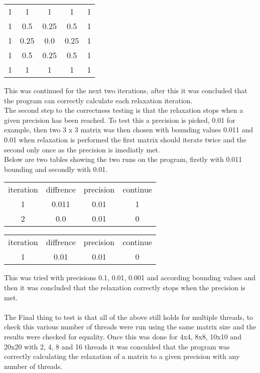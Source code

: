 \documentclass{article}
\begin{document}
\begin{center}
\begin{tabular}{ c c c c c }
 1 & 1 & 1 & 1 & 1 \\
 1 & 0.5 & 0.25 & 0.5 & 1 \\
 1 & 0.25 & 0.0 & 0.25 & 1 \\
 1 & 0.5 & 0.25 & 0.5 & 1 \\
 1 & 1 & 1 & 1 & 1 \\
\end{tabular}
\end{center}

This was continued for the next two iterations, after this it was concluded that
the program can correctly calculate each relaxation iteration.\\
The second step to the correctness testing is that the relaxation stops when a given
precision has been reached. To test this a precision is picked, 0.01 for example,
then two 3 x 3 matrix was then chosen with bounding values 0.011 and 0.01 when relaxation
is performed the first matrix should iterate twice and the second only once as the precision
is imediatly met.\\
Below are two tables showing the two runs on the program, firstly with 0.011 bounding
and secondly with 0.01.

\begin{center}
\begin{tabular}{ c c c c }
iteration & diffrence & precision & continue \\
 1 & 0.011 & 0.01 & 1\\
 2 & 0.0 & 0.01 & 0\\
\end{tabular}
\end{center}

\begin{center}
\begin{tabular}{ c c c c }
iteration & diffrence & precision & continue \\
 1 & 0.01 & 0.01 & 0\\
\end{tabular}
\end{center}

This was tried with precisions 0.1, 0.01, 0.001 and according bounding values and
then it was concluded that the relaxation correctly stops when the precision is met.\\~\\

The Final thing to test is that all of the above still holds for multiple threads,
to check this various number of threads were run using the same matrix size and the results
were checked for equality. Once this was done for 4x4, 8x8, 10x10 and 20x20 with
2, 4, 8 and 16 threads it was conculded that the program was correctly calculating
the relaxation of a matrix to a given precision with any number of threads.
\end{document}
